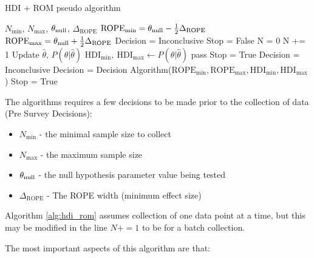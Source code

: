\begin{algorithm}
    \caption{HDI + ROM pseudo algorithm}\label{alg:hdi_rom}
    \begin{algorithmic}
    \Require $N_\mathrm{min}$, $N_\mathrm{max}$, $\theta_{\rm null}$, $\Delta_\mathrm{ROPE}$
    \State $\mathrm{ROPE}_\mathrm{min} = \theta_{\rm null} - \frac{1}{2}\Delta_\mathrm{ROPE}$
    \State $\mathrm{ROPE}_\mathrm{max} = \theta_{\rm null} + \frac{1}{2}\Delta_\mathrm{ROPE}$
    \State Decision = Inconclusive
    \State Stop = False
    \State N = 0
    \State N += 1  
    \State Update $\hat\theta$, $P(\theta|\hat\theta)$  
    \State $\mathrm{HDI}_\mathrm{min}, \ \mathrm{HDI}_\mathrm{max}  \gets P(\theta|\hat\theta)$
         \State pass  
     
        \State Stop = True  
        \State Decision = Inconclusive    
    \Else
        \State Decision = Decision Algorithm($\mathrm{ROPE}_\mathrm{min}, \mathrm{ROPE}_\mathrm{max}, \mathrm{HDI}_\mathrm{min}, \mathrm{HDI}_\mathrm{max}$)
            \State Stop = True  
        \EndIf
    \EndIf
    \EndWhile
    \end{algorithmic}
\end{algorithm}


The algorithms requires a few decisions to be made prior to the collection of data (Pre Survey Decisions):

\begin{itemize}
    \item $N_\mathrm{min}$ - the minimal sample size to collect
    \item $N_\mathrm{max}$ - the maximum sample size
    \item $\theta_{\rm null}$ - the null hypothesis parameter value being tested
    \item $\Delta_\mathrm{ROPE}$ - The ROPE width (minimum effect size)
\end{itemize}

Algorithm \ref{alg:hdi_rom} assumes collection of one data point at a time,
but this may be modified in the line $N += 1$ to be for a batch collection.

The most important aspects of this algorithm are that:


